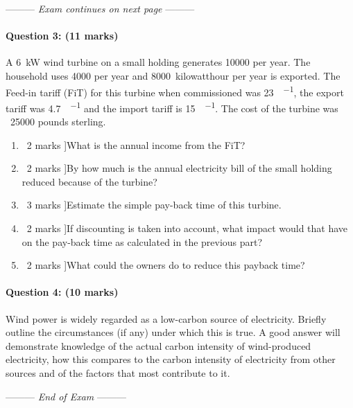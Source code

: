 \documentclass[a4paper,12pt,fleqn]{article}
\newcommand{\middlewords}{Exam continues on next page}
\newcommand{\lastwords}{End of Exam}
\begin{document}
\begin{center}
\vspace{3cm}
--------- \textit{\middlewords} ---------
\end{center}
\newpage

\paragraph{\textbf{Question 3: (11 marks)}}
A \SI{6}{\kilo\watt} wind turbine on a small holding generates \SI{10000}{\kilowatthour} per year. The household uses \SI{4000}{\kilowatthour}
per year and \SI{8000}{kilowatthour} per year is exported. The Feed-in tariff (FiT) for this turbine when commissioned was \SI{23}{\pence\per\kilowatthour},
the export tariff was \SI{4.7}{\pence\per\kilowatthour} and the import tariff is \SI{15}{\pence\per\kilowatthour}. 
The cost of the turbine was \SI{}{25000} pounds sterling.

\begin {enumerate} [label=\alph*)]
\item \lbrack\ 2 marks ]What is the annual income from the FiT?
\item \lbrack\ 2 marks ]By how much is the annual electricity bill of the small holding reduced because of the turbine?
\item \lbrack\ 3 marks ]Estimate the simple pay-back time of this turbine.
\item \lbrack\ 2 marks ]If discounting is taken into account, what impact would that have on the pay-back time as calculated in the previous part?
\item \lbrack\ 2 marks ]What could the owners do to reduce this payback time?
\end{enumerate}


\paragraph{\textbf{Question 4: (10 marks)}}
Wind power is widely regarded as a low-carbon source of electricity. Briefly outline the circumstances (if any) under which this is true.
A good answer will demonstrate knowledge of the actual carbon intensity of wind-produced electricity, how this compares to the carbon intensity 
of electricity from other sources and of the factors that most contribute to it.


\begin{center}
\vspace{3cm}
--------- \textit{\lastwords} ---------
\end{center}
\end{document}

